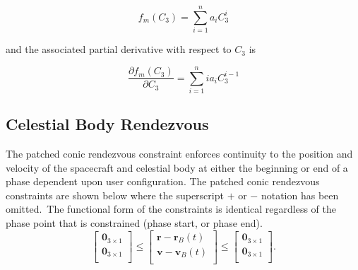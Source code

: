 \begin{equation}
f_m(C_3) = \sum_{i=1}^{n}{a_iC_{3}^i}
\end{equation}

and the associated partial derivative with respect to $C_3$ is

\begin{equation}
\frac{\partial{f_m(C_3)}}{\partial{C_3}} = \sum_{i=1}^{n}{i a_i C_{3}^{i-1}}
\end{equation}




\subsection{Celestial Body Rendezvous}
The patched conic rendezvous constraint enforces continuity to the position and velocity of the spacecraft and celestial body at either the beginning or end of a phase dependent upon user configuration.  The patched conic rendezvous constraints are shown below where the superscript $+$ or $-$ notation has been omitted.~The functional form of the constraints is identical regardless of the phase point that is constrained (phase start, or phase end).
%
\begin{equation}
\begin{bmatrix}
   \mathbf{0}_{3 \times 1} \\
   \mathbf{0}_{3 \times 1} \\
\end{bmatrix}
\leq
\begin{bmatrix}
   \mathbf{r} - \mathbf{r}_B(t) \\
   \mathbf{v} - \mathbf{v}_B(t) \\

\end{bmatrix}
\leq
\begin{bmatrix}
   \mathbf{0}_{3 \times 1} \\
   \mathbf{0}_{3 \times 1} \\
\end{bmatrix}.
\end{equation}

